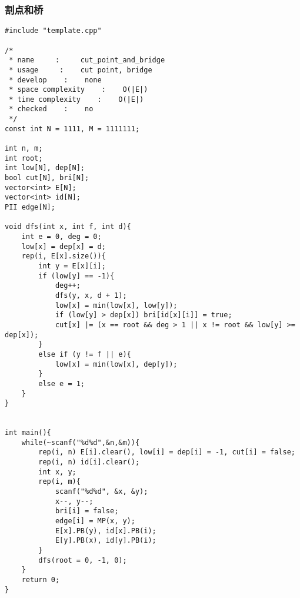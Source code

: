 \subsubsection{割点和桥}
\begin{verbatim}
#include "template.cpp"

/*
 * name     :     cut_point_and_bridge
 * usage     :    cut point, bridge
 * develop    :    none
 * space complexity    :    O(|E|)
 * time complexity    :    O(|E|)
 * checked    :    no
 */
const int N = 1111, M = 1111111;

int n, m;
int root;
int low[N], dep[N];
bool cut[N], bri[N];
vector<int> E[N];
vector<int> id[N];
PII edge[N];

void dfs(int x, int f, int d){
    int e = 0, deg = 0;
    low[x] = dep[x] = d;
    rep(i, E[x].size()){
        int y = E[x][i];
        if (low[y] == -1){
            deg++;
            dfs(y, x, d + 1);
            low[x] = min(low[x], low[y]);
            if (low[y] > dep[x]) bri[id[x][i]] = true;
            cut[x] |= (x == root && deg > 1 || x != root && low[y] >= dep[x]);
        }
        else if (y != f || e){
            low[x] = min(low[x], dep[y]);
        }
        else e = 1;
    }
}


int main(){
    while(~scanf("%d%d",&n,&m)){
        rep(i, n) E[i].clear(), low[i] = dep[i] = -1, cut[i] = false;
        rep(i, n) id[i].clear();
        int x, y;
        rep(i, m){
            scanf("%d%d", &x, &y);
            x--, y--;
            bri[i] = false;
            edge[i] = MP(x, y);
            E[x].PB(y), id[x].PB(i);
            E[y].PB(x), id[y].PB(i);
        }
        dfs(root = 0, -1, 0);
    }
    return 0;
}
\end{verbatim}

